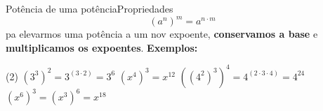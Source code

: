 \documentclass[aspectratio=169,10pt]{uu-beamer}
\begin{document}
    \begin{frame}{Potência de uma potência}{Propriedades}
        \[(a^n)^m = a^{n \cdot m}\]
        pa elevarmos uma potência a um nov expoente, \textbf{conservamos a base} e \textbf{multiplicamos os expoentes}.
        \vspace{1cm}
        \textbf{Exemplos:}
        \begin{tasks}(2)
            \task \((3^3)^2 = 3^{(3 \cdot 2)} = 3^6\)
            \task \((x^4)^3 = x^{12}\)
            \task \(\left( \left( 4^2 \right)^3 \right)^4 = 4^{(2 \cdot 3 \cdot 4)} = 4^{24}\)
            \task \((x^6)^3 = (x^3)^6 = x^{18}\)
        \end{tasks}
    \end{frame}
    
\end{document}
